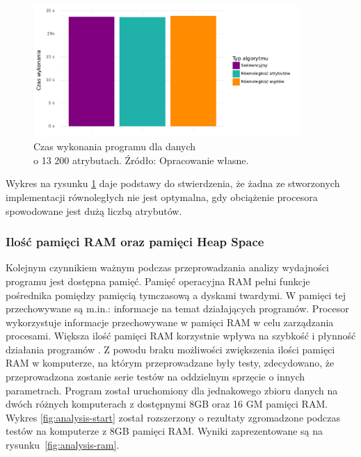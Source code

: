 \documentclass[12pt]{article}
\begin{document}
\begin{figure}[H]
    \centering
	\includegraphics[width=0.9\textwidth]{analysis-attributes-bar-plot.pdf}
    \caption{Czas wykonania programu dla danych\\ o 13 200 atrybutach. Źródło: Opracowanie własne.}
    \label{fig:analysis-attributes-bar-plot}
\end{figure}

Wykres na rysunku \ref{fig:analysis-attributes-bar-plot} daje podstawy do stwierdzenia, że żadna ze stworzonych implementacji równoległych nie jest optymalna,
gdy obciążenie procesora spowodowane jest dużą liczbą atrybutów.

\subsubsection{Ilość pamięci RAM oraz pamięci Heap Space}

Kolejnym czynnikiem ważnym podczas przeprowadzania analizy wydajności programu jest dostępna pamięć.
Pamięć operacyjna RAM pełni funkcje pośrednika pomiędzy pamięcią tymczasową a dyskami twardymi.
W pamięci tej przechowywane są m.in.: informacje na temat działających programów. Procesor wykorzystuje informacje
przechowywane w pamięci RAM w celu zarządzania procesami.
Większa ilość pamięci RAM korzystnie wpływa na szybkość i płynność działania programów \cite{the-art-of-multiprocessor-programming}. 
Z powodu braku możliwości zwiększenia ilości pamięci RAM w komputerze, na którym przeprowadzane były testy, zdecydowano, że
przeprowadzona zostanie serie testów na oddzielnym sprzęcie o innych parametrach. Program został uruchomiony
dla jednakowego zbioru danych na dwóch różnych komputerach z dostępnymi 8GB oraz 16 GM pamięci RAM.
Wykres \ref{fig:analysis-start} został rozszerzony o rezultaty zgromadzone podczas testów na komputerze z 8GB pamięci RAM.
Wyniki zaprezentowane są na rysunku~\ref{fig:analysis-ram}.
\end{document}
